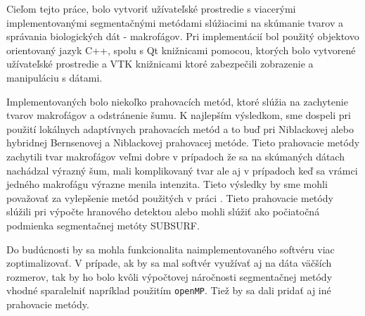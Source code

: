 \documentclass[a4paper,11pt,oneside]{article}%
\begin{document}
Cieľom tejto práce, bolo vytvoriť užívateľské prostredie s viacerými implementovanými segmentačnými metódami slúžiacimi na skúmanie tvarov a správania biologických dát - makrofágov. Pri implementácií bol použitý objektovo orientovaný jazyk C++, spolu s Qt knižnicami pomocou, ktorých bolo vytvorené užívateľské prostredie a VTK knižnicami ktoré zabezpečili zobrazenie a manipuláciu s dátami.

Implementovaných bolo niekoľko prahovacích metód, ktoré slúžia na zachytenie tvarov makrofágov a odstránenie šumu. K najlepším výsledkom, sme dospeli pri použití lokálnych adaptívnych prahovacích metód a to buď pri Niblackovej alebo hybridnej Bernsenovej a Niblackovej prahovacej metóde. Tieto prahovacie metódy zachytili tvar makrofágov veľmi dobre v prípadoch že sa na skúmaných dátach nachádzal výrazný šum, mali komplikovaný tvar ale aj v prípadoch keď sa vrámci jedného makrofágu výrazne menila intenzita. Tieto výsledky by sme mohli považovať za vylepšenie metód použitých v práci \cite{sora}. Tieto prahovacie metódy slúžili pri výpočte hranového detektou alebo mohli slúžiť ako počiatočná podmienka segmentačnej metóty SUBSURF. 

Do budúcnosti by sa mohla funkcionalita naimplementovaného softvéru viac zoptimalizovať. V prípade, ak by sa mal softvér využívať aj na dáta väčších rozmerov, tak by ho bolo kvôli výpočtovej náročnosti segmentačnej metódy vhodné sparalelniť napríklad použitím \texttt{openMP}. Tiež by sa dali pridať aj iné prahovacie metódy.
\end{document}
